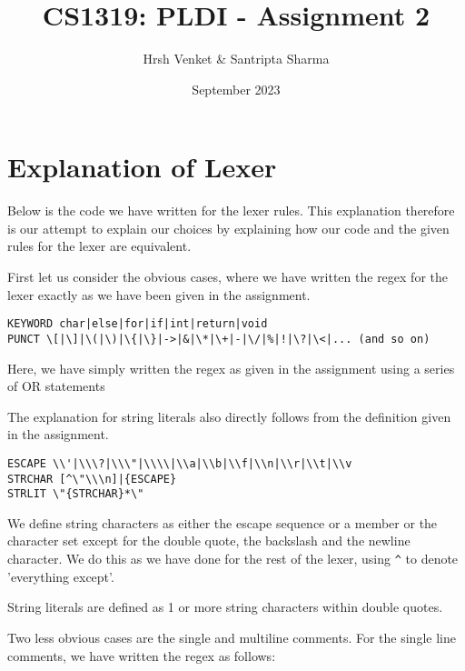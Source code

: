 \documentclass{article}
\title{CS1319: PLDI - Assignment 2}
\author{Hrsh Venket \& Santripta Sharma}
\date{September 2023}
\begin{document}
\maketitle 


\section*{Explanation of Lexer}
Below is the code we have written for the lexer rules. This explanation therefore is our attempt to explain our choices by explaining how our code and the given rules for the lexer are equivalent.\bigskip

First let us consider the obvious cases, where we have written the regex for the lexer exactly as we have been given in the assignment.

\begin{verbatim}
KEYWORD char|else|for|if|int|return|void
PUNCT \[|\]|\(|\)|\{|\}|->|&|\*|\+|-|\/|%|!|\?|\<|... (and so on)
\end{verbatim}

Here, we have simply written the regex as given in the assignment using a series of OR statements\bigskip

The explanation for string literals also directly follows from the definition given in the assignment.

\begin{verbatim}
ESCAPE \\'|\\\?|\\\"|\\\\|\\a|\\b|\\f|\\n|\\r|\\t|\\v
STRCHAR [^\"\\\n]|{ESCAPE}
STRLIT \"{STRCHAR}*\"
\end{verbatim}

We define string characters as either the escape sequence or a member or the character set except for the double quote, the backslash and the newline character. We do this as we have done for the rest of the lexer, using \verb|^| to denote 'everything except'.\bigskip

String literals are defined as 1 or more string characters within double quotes.\bigskip

Two less obvious cases are the single and multiline comments. For the single line comments, we have written the regex as follows:
\end{document}
